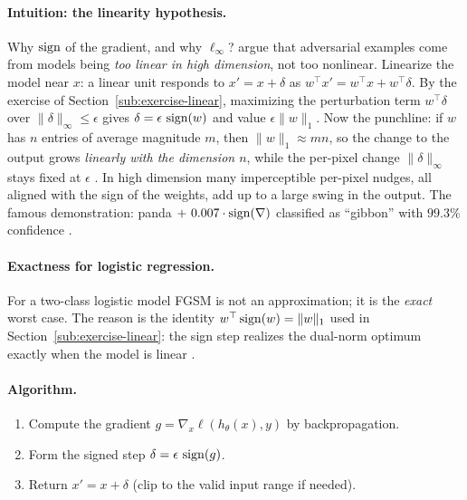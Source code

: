 \paragraph{Intuition: the linearity hypothesis.} Why $\operatorname{sign}$ of the gradient, and why $\ell_\infty$? \citet{goodfellow2015explaining} argue that adversarial examples come from models being \emph{too linear in high dimension}, not too nonlinear. Linearize the model near $x$: a linear unit responds to $x' = x+\delta$ as $w^\top x' = w^\top x + w^\top\delta$. By the exercise of Section~\ref{sub:exercise-linear}, maximizing the perturbation term $w^\top\delta$ over $\|\delta\|_\infty\le\epsilon$ gives $\delta=\epsilon\,\operatorname{sign}(w)$ and value $\epsilon\|w\|_1$. Now the punchline: if $w$ has $n$ entries of average magnitude $m$, then $\|w\|_1\approx mn$, so the change to the output grows \emph{linearly with the dimension $n$}, while the per-pixel change $\|\delta\|_\infty$ stays fixed at $\epsilon$ \citep{goodfellow2015explaining}. In high dimension many imperceptible per-pixel nudges, all aligned with the sign of the weights, add up to a large swing in the output. The famous demonstration: panda $+\ 0.007\cdot\sign(\nabla)$ classified as ``gibbon'' with $99.3\%$ confidence \citep{goodfellow2015explaining}.

\paragraph{Exactness for logistic regression.} For a two-class logistic model FGSM is not an approximation; it is the \emph{exact} worst case. The reason is the identity $w^\top\operatorname{sign}(w)=\|w\|_1$ used in Section~\ref{sub:exercise-linear}: the sign step realizes the dual-norm optimum exactly when the model is linear \citep{goodfellow2015explaining,kolter2018adversarial}.

\paragraph{Algorithm.}
\begin{enumerate}[label=\textbf{\arabic*.},nosep]
  \item Compute the gradient $g = \nabla_x \ell(h_\theta(x),y)$ by backpropagation.
  \item Form the signed step $\delta = \epsilon\,\operatorname{sign}(g)$.
  \item Return $x' = x+\delta$ (clip to the valid input range if needed).
\end{enumerate}

